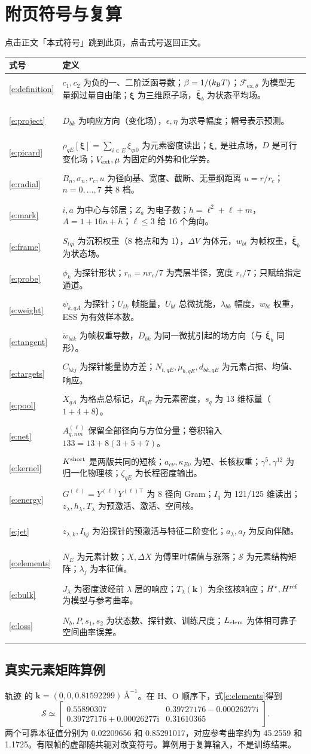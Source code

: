 \documentclass[UTF8,fontset=none,10pt,a4paper]{ctexart}
\newcommand{\xiF}{\bm\xi}
\newcommand{\X}{\bar{\bm\xi}}
\newcommand{\ExT}{\mathcal F_{\mathrm{ex},\theta}}
\newcommand{\Ang}{\text{\AA}}
\newcommand{\code}[1]{\texttt{\detokenize{#1}}}
\newcommand{\sym}[2]{\hypertarget{sym:#1}{\eqref{#1}} & #2 \\[3pt]}
\begin{document}
\section*{附页\quad 符号与复算}
\small
点击正文「本式符号」跳到此页，点击式号返回正文。\par\smallskip
\begin{tabularx}{\linewidth}{@{}p{10mm}X@{}}
\toprule
式号 & 定义 \\
\midrule
\sym{e:definition}{$c_1,c_2$ 为负的一、二阶泛函导数；$\beta=1/(k_{\rm B}T)$；$\ExT$ 为模型无量纲过量自由能；$\xiF$ 为三维原子场，$\X_b$ 为状态平均场。}
\sym{e:project}{$D_{bk}$ 为响应方向（变化场），$\epsilon,\eta$ 为求导幅度；帽号表示预测。}
\sym{e:picard}{$\rho_{qE}[\xiF]=\sum_{i\in E}\xi_{qi0}$ 为元素密度读出；$\xiF_*$ 是驻点场，$D$ 是可行变化场；$V_{\rm ext},\mu$ 为固定的外势和化学势。}
\sym{e:radial}{$B_n,\sigma_n,r_c,u$ 为径向基、宽度、截断、无量纲距离 $u=r/r_c$；$n=0,\ldots,7$ 共 8 档。}
\sym{e:mark}{$i,a$ 为中心与邻居；$Z_a$ 为电子数；$h=\ell^2+\ell+m$，$A=1+16n+h$；$\ell\le3$ 给 16 个角向。}
\sym{e:frame}{$S_{tqi}$ 为沉积权重（8 格点和为 1），$\Delta V$ 为体元，$w_{bt}$ 为帧权重，$\X_b$ 为状态场。}
\sym{e:probe}{$\phi_k$ 为探针形状；$r_n=nr_c/7$ 为壳层半径，宽度 $r_c/7$；只赋给指定通道。}
\sym{e:weight}{$\psi_{k,qA}$ 为探针；$U_{tk}$ 帧能量，$U_{bt}$ 总微扰能，$\lambda_{bk}$ 幅度，$w_{bt}$ 权重，ESS 为有效样本数。}
\sym{e:tangent}{$\dot w_{btk}$ 为帧权重导数，$D_{bk}$ 为同一微扰引起的场方向（与 $\X_b$ 同形）。}
\sym{e:targets}{$C_{bkj}$ 为探针能量协方差；$N_{t,qE},\mu_{b,qE},d_{bk,qE}$ 为元素占据、均值、响应。}
\sym{e:pool}{$X_{qA}$ 为格点总标记，$R_{qE}$ 为元素密度，$s_q$ 为 13 维标量（$1+4+8$）。}
\sym{e:net}{$A^{(\ell)}_{q,nm}$ 保留全部径向与方位分量；卷积输入 $133=13+8(3+5+7)$。}
\sym{e:kernel}{$K^{\rm short}$ 是两版共同的短核；$a_{c\nu},\kappa_{E\nu}$ 为短、长核权重；$\gamma^5,\gamma^{12}$ 为归一化物理核；$\zeta_{qE}$ 为长程密度输出。}
\sym{e:energy}{$G^{(\ell)}=Y^{(\ell)}Y^{(\ell)\top}$ 为 8 径向 Gram；$I_q$ 为 121/125 维读出；$z_\lambda,h_\lambda,T_\lambda$ 为预激活、激活、空间核。}
\sym{e:jet}{$z_{\lambda,k},I_{kj}$ 为沿探针的预激活与特征二阶变化；$a_\lambda,a_I$ 为反向伴随。}
\sym{e:elements}{$N_E$ 为元素计数；$X,\Delta X$ 为傅里叶幅值与涨落；$\mathcal S$ 为元素结构矩阵；$\lambda_j$ 为本征值。}
\sym{e:bulk}{$J_\lambda$ 为密度波经前 $\lambda$ 层的响应；$T_\lambda(\bm k)$ 为余弦核响应；$H^\star,H^{\rm ref}$ 为模型与参考曲率。}
\sym{e:loss}{$N_b,P,s_1,s_2$ 为状态数、探针数、训练尺度；$L_{\rm elem}$ 为体相可靠子空间曲率误差。}
\bottomrule
\end{tabularx}

\subsection*{真实元素矩阵算例}
轨迹 \code{H2O-T986.4-r00-rho0.6700} 的 $\bm k=(0,0,0.81592299)\,\Ang^{-1}$。在 H、O 顺序下，式\eqref{e:elements}得到
\[
 \mathcal S\simeq
 \begin{bmatrix}
 0.55890307&0.39727176-0.00026277\mathrm i\\
 0.39727176+0.00026277\mathrm i&0.31610365
 \end{bmatrix}.
\]
两个可靠本征值分别为 0.02209656 和 0.85291017，对应参考曲率约为 45.2559 和 1.1725。有限帧的虚部随共轭对改变符号。算例用于复算输入，不是训练结果。
\end{document}
